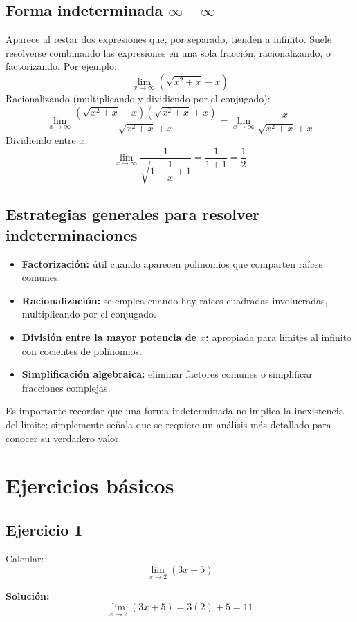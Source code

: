 \documentclass[12pt]{article}
\begin{document}
\subsection{Forma indeterminada $\infty - \infty$}

Aparece al restar dos expresiones que, por separado, tienden a infinito. Suele resolverse combinando las expresiones en una sola fracción, racionalizando, o factorizando. Por ejemplo:
\[
\lim_{x \to \infty} \left( \sqrt{x^2 + x} - x \right)
\]
Racionalizando (multiplicando y dividiendo por el conjugado):
\[
\lim_{x \to \infty} \frac{(\sqrt{x^2+x} - x)(\sqrt{x^2+x}+x)}{\sqrt{x^2+x}+x} = \lim_{x \to \infty} \frac{x}{\sqrt{x^2+x}+x}
\]
Dividiendo entre $x$:
\[
\lim_{x \to \infty} \frac{1}{\sqrt{1 + \dfrac{1}{x}} + 1} = \frac{1}{1+1} = \frac{1}{2}
\]

\subsection{Estrategias generales para resolver indeterminaciones}

\begin{itemize}
    \item \textbf{Factorización:} útil cuando aparecen polinomios que comparten raíces comunes.
    \item \textbf{Racionalización:} se emplea cuando hay raíces cuadradas involucradas, multiplicando por el conjugado.
    \item \textbf{División entre la mayor potencia de $x$:} apropiada para límites al infinito con cocientes de polinomios.
    \item \textbf{Simplificación algebraica:} eliminar factores comunes o simplificar fracciones complejas.
\end{itemize}

Es importante recordar que una forma indeterminada no implica la inexistencia del límite; simplemente señala que se requiere un análisis más detallado para conocer su verdadero valor.

\section{Ejercicios básicos}

\subsection{Ejercicio 1}
Calcular:
\[
\lim_{x \to 2} (3x + 5)
\]

\textbf{Solución:}
\[
\lim_{x \to 2} (3x + 5) = 3(2) + 5 = 11
\]
\end{document}
